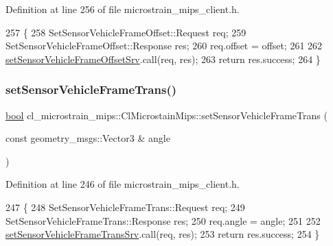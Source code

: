 Definition at line 256 of file microstrain\+\_\+mips\+\_\+client.\+h.


\begin{DoxyCode}
257     \{
258         SetSensorVehicleFrameOffset::Request req;
259         SetSensorVehicleFrameOffset::Response res;
260         req.offset = offset;
261 
262         \hyperlink{classcl__microstrain__mips_1_1ClMicrostainMips_a977cce1917e12d96f614266baa4ae55d}{setSensorVehicleFrameOffsetSrv}.call(req, res);
263         \textcolor{keywordflow}{return} res.success;
264     \}
\end{DoxyCode}
\mbox{\label{classcl__microstrain__mips_1_1ClMicrostainMips_a4dd8966794ba1697319f0f1812160405}} 
\subsubsection{\texorpdfstring{set\+Sensor\+Vehicle\+Frame\+Trans()}{setSensorVehicleFrameTrans()}}
{\footnotesize\ttfamily \hyperlink{classbool}{bool} cl\+\_\+microstrain\+\_\+mips\+::\+Cl\+Microstain\+Mips\+::set\+Sensor\+Vehicle\+Frame\+Trans (\begin{DoxyParamCaption}\item[{const geometry\+\_\+msgs\+::\+Vector3 \&}]{angle }\end{DoxyParamCaption})\hspace{0.3cm}{\ttfamily [inline]}}



Definition at line 246 of file microstrain\+\_\+mips\+\_\+client.\+h.


\begin{DoxyCode}
247     \{
248         SetSensorVehicleFrameTrans::Request req;
249         SetSensorVehicleFrameTrans::Response res;
250         req.angle = angle;
251 
252         \hyperlink{classcl__microstrain__mips_1_1ClMicrostainMips_ac020b44e78addaa26beb44081d99f194}{setSensorVehicleFrameTransSrv}.call(req, res);
253         \textcolor{keywordflow}{return} res.success;
254     \}
\end{DoxyCode}
\mbox{\label{classcl__microstrain__mips_1_1ClMicrostainMips_a24996ea87cf409ae0a912931dc088eb2}} 
